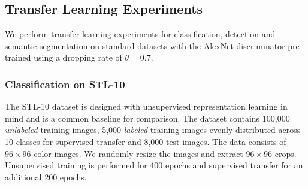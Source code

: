 \documentclass[10pt,twocolumn,letterpaper]{article}
\begin{document}
\begin{table}[t]
\centering
\caption{Comparison of test-set accuracy on STL-10 with other published results. Following the guidelines in \cite{coates2011analysis} the average accuracy from models trained on the ten pre-defined folds is reported. We train a linear classifier on top of \texttt{conv5} features for a fair comparison with the other methods.}
\label{tab:stl}
\end{table}

\subsection{Transfer Learning Experiments}
We perform transfer learning experiments for classification, detection and semantic segmentation on standard datasets with the AlexNet discriminator pre-trained using a dropping rate of $\theta=0.7$. 

\subsubsection{Classification on STL-10}
The STL-10 dataset \cite{coates2011analysis} is designed with unsupervised representation learning in mind and is a common baseline for comparison. The dataset contains 100,000 \emph{unlabeled} training images, 5,000 \emph{labeled} training images evenly distributed across 10 classes for supervised transfer and 8,000 test images. The data consists of $96\times96$ color images. We randomly resize the images and extract $96\times96$ crops. Unsupervised training is performed for 400 epochs and supervised transfer for an additional 200 epochs.
\end{document}
